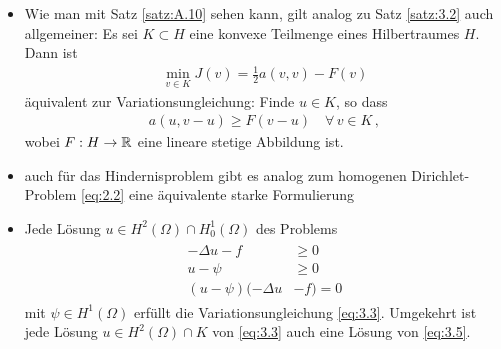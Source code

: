 \begin{itemize}
\item \begin{bem}
Wie man mit Satz \ref{satz:A.10} sehen kann, gilt analog zu Satz \ref{satz:3.2} auch allgemeiner: Es sei $K\subset H$ eine konvexe Teilmenge eines Hilbertraumes $H$. Dann ist
\begin{align*}
	\min_{v\in K} J(v) = \frac 1 2 a(v,v)-F(v)
\end{align*}
äquivalent zur Variationsungleichung: Finde $u \in K$, so dass
\begin{align*}
	a(u,v-u) \ge F(v-u) \quad \forall \, v \in K \, ,
\end{align*}
wobei $F :H\rightarrow \mathbb{R}$ eine lineare stetige Abbildung ist.
\end{bem}

\item auch für das Hindernisproblem gibt es analog zum homogenen Dirichlet-Problem \eqref{eq:2.2} eine äquivalente starke Formulierung

\item \begin{satz}\label{satz:3.4} Jede Lösung $u \in H^2(\Omega) \cap H^1_0(\Omega)$ des Problems
\begin{align}\label{eq:3.5}
\begin{aligned}
	-\Delta u -f&\ge 0 \\
	u-\psi &\ge 0 \\
	(u-\psi) (-\Delta u &- f) = 0
\end{aligned}
\end{align}
mit $\psi \in H^1(\Omega)$ erfüllt die Variationsungleichung \eqref{eq:3.3}. Umgekehrt ist jede Lösung $u\in H^2(\Omega) \cap K$ von \eqref{eq:3.3} auch eine Lösung von \eqref{eq:3.5}.
\end{satz}


\end{itemize}
